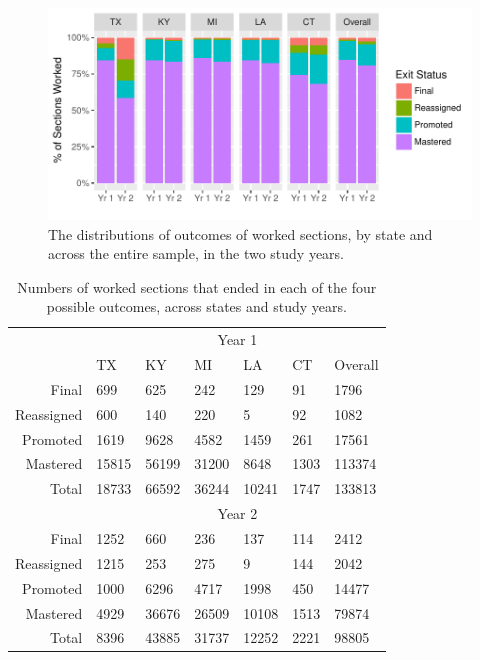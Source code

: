 \documentclass[notitlepage,12pt]{jedm}\usepackage[]{graphicx}\usepackage[]{color}
\makeatletter
\def\maxwidth{ %
  \ifdim\Gin@nat@width>\linewidth
    \linewidth
  \else
    \Gin@nat@width
  \fi
}
\makeatother
\begin{document}
\begin{figure}
  \centering

\includegraphics[width=\maxwidth]{figure/overallStatus-1} 

\caption{The distributions of outcomes of worked sections, by state and across the
  entire sample, in the two study years.}
\label{fig:overallStatus}
\end{figure}

\begin{table}
  \centering
 \begin{tabular}{rllllll}%

&   \multicolumn{6}{c}{Year 1}\\%
&TX&KY&MI&LA&CT&Overall\\Final&699&625&242&129&91&1796\\Reassigned&600&140&220&5&92&1082\\Promoted&1619&9628&4582&1459&261&17561\\Mastered&15815&56199&31200&8648&1303&113374\\Total&18733&66592&36244&10241&1747&133813\\&\multicolumn{6}{c}{Year 2}\\ 
Final&1252&660&236&137&114&2412\\Reassigned&1215&253&275&9&144&2042\\Promoted&1000&6296&4717&1998&450&14477\\Mastered&4929&36676&26509&10108&1513&79874\\Total&8396&43885&31737&12252&2221&98805\\

\end{tabular}
\caption{Numbers of worked sections that ended in each of the
  four possible outcomes, across states and study years.}
\label{tab:overallStatus}
\end{table}
\end{document}
